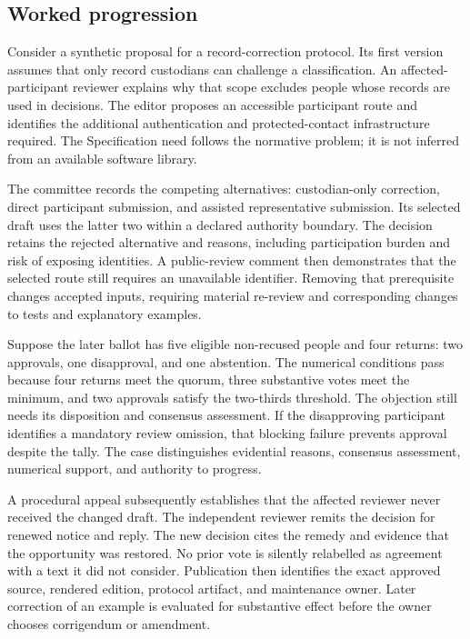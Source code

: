 \documentclass[11pt,a4paper]{article}
\begin{document}
\subsection{Worked progression}
Consider a synthetic proposal for a record-correction protocol. Its first version assumes that only record custodians can challenge a classification. An affected-participant reviewer explains why that scope excludes people whose records are used in decisions. The editor proposes an accessible participant route and identifies the additional authentication and protected-contact infrastructure required. The Specification need follows the normative problem; it is not inferred from an available software library.

The committee records the competing alternatives: custodian-only correction, direct participant submission, and assisted representative submission. Its selected draft uses the latter two within a declared authority boundary. The decision retains the rejected alternative and reasons, including participation burden and risk of exposing identities. A public-review comment then demonstrates that the selected route still requires an unavailable identifier. Removing that prerequisite changes accepted inputs, requiring material re-review and corresponding changes to tests and explanatory examples.

Suppose the later ballot has five eligible non-recused people and four returns: two approvals, one disapproval, and one abstention. The numerical conditions pass because four returns meet the quorum, three substantive votes meet the minimum, and two approvals satisfy the two-thirds threshold. The objection still needs its disposition and consensus assessment. If the disapproving participant identifies a mandatory review omission, that blocking failure prevents approval despite the tally. The case distinguishes evidential reasons, consensus assessment, numerical support, and authority to progress.

A procedural appeal subsequently establishes that the affected reviewer never received the changed draft. The independent reviewer remits the decision for renewed notice and reply. The new decision cites the remedy and evidence that the opportunity was restored. No prior vote is silently relabelled as agreement with a text it did not consider. Publication then identifies the exact approved source, rendered edition, protocol artifact, and maintenance owner. Later correction of an example is evaluated for substantive effect before the owner chooses corrigendum or amendment.
\end{document}
